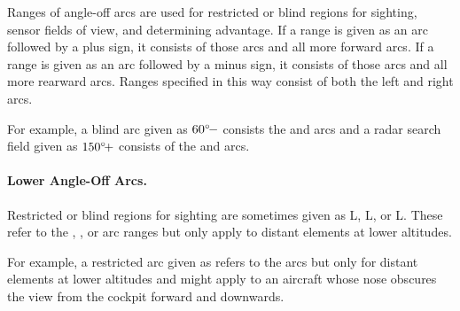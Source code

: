 {Ranges of angle-off arcs are used for restricted or blind regions for sighting, sensor fields of view, and determining advantage. If a range is given as an arc followed by a plus sign, it consists of those arcs and all more forward arcs. If a range is given as an arc followed by a minus sign, it consists of those arcs and all more rearward arcs. Ranges specified in this way consist of both the left and right arcs.

For example, a blind arc given as $\mbox{$60{^\circ}\!-$}$ consists the  and  arcs and a radar search field given as $\mbox{$150{^\circ}\!+$}$ consists of the  and  arcs. 

\paragraph{Lower Angle-Off Arcs.}
\label{rule:lower-angle-off-arcs}

Restricted or blind regions for sighting are sometimes given as L, L, or L. These refer to the , , or  arc ranges but only apply to distant elements at lower altitudes.

For example, a restricted arc given as  refers to the  arcs but only for distant elements at lower altitudes and might apply to an aircraft whose nose obscures the view from the cockpit forward and downwards.

}


